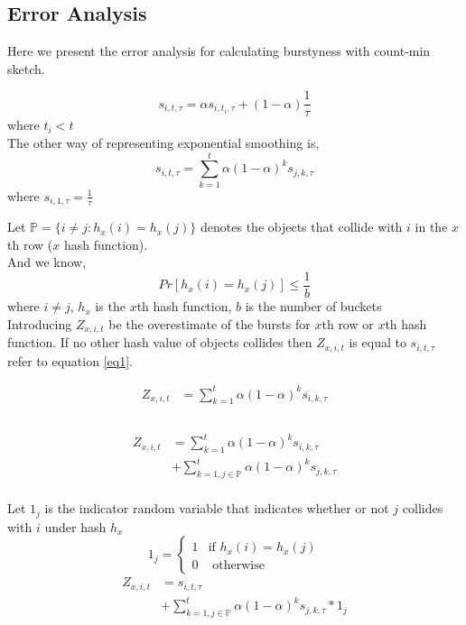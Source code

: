 \subsection{Error Analysis}
\label{error_analysis}
Here we present the error analysis for calculating burstyness with count-min sketch.

$$s_{i,t,\tau} = \alpha s_{i,t_{i},\tau} + (1-\alpha) \frac{1}{\tau}$$ \hfill where $t_i <  t$\\
The other way of representing exponential smoothing is,
$$s_{i,t,\tau} = \sum_{k=1}^{t} \alpha (1-\alpha)^k s_{j,k,\tau}$$
\hfill where $s_{i,1,\tau} = \frac{1}{\tau}$

Let $\mathbb{P} =\{ i\neq j: h_x(i)=h_x(j)\}$ denotes the objects that collide with $i$ in the $x$th row ($x$ hash function). \\

And we know,
$$Pr[h_{x}(i)=h_{x}(j)] \leq \frac{1}{b}$$
\hfill where $i \neq j$, $h_x$ is the $x$th hash function, $b$ is the number of buckets
\\

Introducing
$Z_{x,i,t}$ be the overestimate of the bursts for $x$th row or $x$th hash function. If no other hash value of objects collides then $Z_{x,i,t}$ is equal to $s_{i,t,\tau}$ refer to equation \ref{eq1}.

\begin{equation} \label{eq1}
\begin{split}
Z_{x,i,t} &= \sum_{k=1}^{t} \alpha (1-\alpha)^k s_{i,k,\tau}\\
\\
\end{split}
\end{equation}


\begin{equation} \label{eq2}
\begin{split}
Z_{x,i,t} &= \sum_{k=1}^{t}  \alpha (1-\alpha)^k s_{i,k,\tau} \\
& + \sum_{k=1, j \in \mathbb{P}}^{t} \alpha (1-\alpha)^k s_{j,k,\tau}
\\
\end{split}
\end{equation}

Let $1_j$ is the indicator random variable that indicates whether or not $j$ collides with $i$ under hash $h_x$
\[
 1_j = 
\begin{cases}
    1 & \text{if }  h_x(i) = h_x(j) \\
    0 & \text{ otherwise} 
\end{cases}
\]
\begin{equation} \label{eq3}
\begin{split}
Z_{x,i,t} & = s_{i,t,\tau} \\
        & + \sum_{k=1, j \in \mathbb{P}}^{t} \alpha (1-\alpha)^k s_{j,k,\tau} * 1_{j}
\end{split}
\end{equation}

